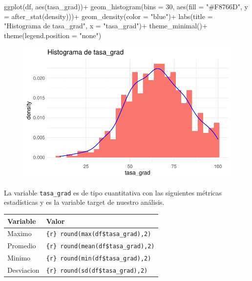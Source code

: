 \documentclass[
  letterpaper,
  DIV=11,
  numbers=noendperiod]{scrartcl}
\newenvironment{Shaded}{\begin{snugshade}}{\end{snugshade}}
\newcommand{\AttributeTok}[1]{\textcolor[rgb]{0.40,0.45,0.13}{#1}}
\newcommand{\DecValTok}[1]{\textcolor[rgb]{0.68,0.00,0.00}{#1}}
\newcommand{\FunctionTok}[1]{\textcolor[rgb]{0.28,0.35,0.67}{#1}}
\newcommand{\NormalTok}[1]{\textcolor[rgb]{0.00,0.23,0.31}{#1}}
\newcommand{\SpecialCharTok}[1]{\textcolor[rgb]{0.37,0.37,0.37}{#1}}
\newcommand{\StringTok}[1]{\textcolor[rgb]{0.13,0.47,0.30}{#1}}
\begin{document}
\begin{Shaded}
\begin{Highlighting}[]
\FunctionTok{ggplot}\NormalTok{(df, }\FunctionTok{aes}\NormalTok{(tasa\_grad))}\SpecialCharTok{+}
  \FunctionTok{geom\_histogram}\NormalTok{(}\AttributeTok{bins =} \DecValTok{30}\NormalTok{, }\FunctionTok{aes}\NormalTok{(}\AttributeTok{fill =} \StringTok{"\#F8766D"}\NormalTok{, }\AttributeTok{y =} \FunctionTok{after\_stat}\NormalTok{(density)))}\SpecialCharTok{+}
  \FunctionTok{geom\_density}\NormalTok{(}\AttributeTok{color =} \StringTok{"blue"}\NormalTok{)}\SpecialCharTok{+}
  \FunctionTok{labs}\NormalTok{(}\AttributeTok{title =} \StringTok{"Histograma de tasa\_grad"}\NormalTok{,}
       \AttributeTok{x =} \StringTok{"tasa\_grad"}\NormalTok{)}\SpecialCharTok{+}
  \FunctionTok{theme\_minimal}\NormalTok{()}\SpecialCharTok{+}
  \FunctionTok{theme}\NormalTok{(}\AttributeTok{legend.position =} \StringTok{"none"}\NormalTok{)}
\end{Highlighting}
\end{Shaded}

\begin{figure}[H]

{\centering \includegraphics{TP_final_files/figure-pdf/unnamed-chunk-21-1.pdf}

}

\end{figure}

La variable \texttt{tasa\_grad} es de tipo cuantitativa con las
siguientes métricas estadísticas y es la variable target de nuestro
análisis.

\begin{longtable}[]{@{}ll@{}}
\toprule\noalign{}
Variable & Valor \\
\midrule\noalign{}
\endhead
\bottomrule\noalign{}
\endlastfoot
Maximo & \texttt{\{r\}\ round(max(df\$tasa\_grad),2)} \\
Promedio & \texttt{\{r\}\ round(mean(df\$tasa\_grad),2)} \\
Minimo & \texttt{\{r\}\ round(min(df\$tasa\_grad),2)} \\
Desviacion & \texttt{\{r\}\ round(sd(df\$tasa\_grad),2)} \\
\end{longtable}
\end{document}

